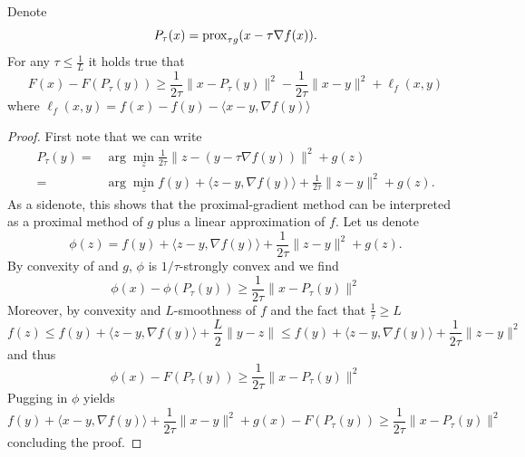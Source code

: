 \begin{lemma}
    Denote 
    \begin{equation}
        P_\tau(x) = \mathrm{prox}_{\tau g}(x-\tau \nabla f(x)).
    \end{equation}
    For any $\tau\leq \frac{1}{L}$ it holds true that 
    \begin{equation}
        F(x) - F(P_\tau (y))\geq \frac{1}{2\tau}\|x-P_\tau (y)\|^2 - \frac{1}{2\tau}\|x-y\|^2 + \ell_f(x,y)
    \end{equation}
    where $\ell_f(x,y) = f(x) - f(y) - \langle x-y,\nabla f(y)\rangle$
\end{lemma}
\begin{proof}
    First note that we can write
    \begin{equation}
        \begin{aligned}
            P_\tau (y) 
            =& \arg\min_z \frac{1}{2\tau}\|z-(y-\tau \nabla f(y))\|^2 + g(z)\\
            =& \arg\min_z f(y) + \langle z-y,\nabla f(y)\rangle + \frac{1}{2\tau}\|z-y\|^2 + g(z).
        \end{aligned}
    \end{equation}
    As a sidenote, this shows that the proximal-gradient method can be interpreted as a proximal method of $g$ plus a linear approximation of $f$. Let us denote 
    \begin{equation}
        \phi(z) = f(y) + \langle z-y,\nabla f(y)\rangle + \frac{1}{2\tau}\|z-y\|^2 + g(z).
    \end{equation}
    By convexity of and $g$, $\phi$ is $1/\tau$-strongly convex and we find
    \begin{equation}
        \phi(x) - \phi(P_\tau (y))\geq \frac{1}{2\tau}\|x-P_\tau (y)\|^2
    \end{equation}
    Moreover, by convexity and $L$-smoothness of $f$ and the fact that $\frac{1}{\tau}\geq L$
    \begin{equation}
        f(z) \leq f(y) + \langle z-y,\nabla f(y)\rangle + \frac{L}{2}\|y-z\| \leq f(y) + \langle z-y,\nabla f(y)\rangle + \frac{1}{2\tau}\|z-y\|^2
    \end{equation}
    and thus
    \begin{equation}
        \phi(x) - F(P_\tau (y))\geq \frac{1}{2\tau}\|x-P_\tau (y)\|^2
    \end{equation}
    Pugging in $\phi$ yields
    \begin{equation}
        f(y) + \langle x-y,\nabla f(y)\rangle + \frac{1}{2\tau}\|x-y\|^2 + g(x) - F(P_\tau (y))\geq \frac{1}{2\tau}\|x-P_\tau (y)\|^2
    \end{equation}
    concluding the proof.
\end{proof}
